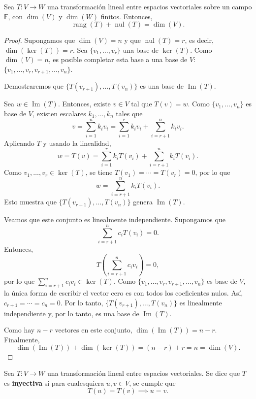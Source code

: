 \begin{theorem}\label{teodim}
Sea $T: V \to W$ una transformación lineal entre espacios vectoriales sobre un campo $\mathbb{F}$, con $\dim(V)$ y $\dim(W)$ finitos. Entonces,
\[
\operatorname{rang}(T) + \operatorname{nul}(T) = \dim(V).
\]
\begin{proof}
Supongamos que $\dim(V) = n$ y que $\operatorname{nul}(T) = r$, es decir, $\dim(\ker(T)) = r$. Sea $\{v_1, \ldots, v_r\}$ una base de $\ker(T)$. Como $\dim(V) = n$, es posible completar esta base a una base de $V$: $\{v_1, \ldots, v_r, v_{r+1}, \ldots, v_n\}$.

Demostraremos que $\{T(v_{r+1}), \ldots, T(v_n)\}$ es una base de $\operatorname{Im}(T)$.

Sea $w \in \operatorname{Im}(T)$. Entonces, existe $v \in V$ tal que $T(v) = w$. Como $\{v_1, \ldots, v_n\}$ es base de $V$, existen escalares $k_1, \ldots, k_n$ tales que
\[
v = \sum_{i=1}^n k_i v_i = \sum_{i=1}^r k_i v_i + \sum_{i=r+1}^n k_i v_i.
\]
Aplicando $T$ y usando la linealidad,
\[
w = T(v) = \sum_{i=1}^r k_i T(v_i) + \sum_{i=r+1}^n k_i T(v_i).
\]
Como $v_1, \ldots, v_r \in \ker(T)$, se tiene $T(v_1) = \cdots = T(v_r) = 0$, por lo que
\[
w = \sum_{i=r+1}^n k_i T(v_i).
\]
Esto muestra que $\{T(v_{r+1}), \ldots, T(v_n)\}$ genera $\operatorname{Im}(T)$.

Veamos que este conjunto es linealmente independiente. Supongamos que
\[
\sum_{i=r+1}^n c_i T(v_i) = 0.
\]
Entonces,
\[
T\left(\sum_{i=r+1}^n c_i v_i\right) = 0,
\]
por lo que $\sum_{i=r+1}^n c_i v_i \in \ker(T)$. Como $\{v_1, \ldots, v_r, v_{r+1}, \ldots, v_n\}$ es base de $V$, la única forma de escribir el vector cero es con todos los coeficientes nulos. Así, $c_{r+1} = \cdots = c_n = 0$. Por lo tanto, $\{T(v_{r+1}), \ldots, T(v_n)\}$ es linealmente independiente y, por lo tanto, es una base de $\operatorname{Im}(T)$.

Como hay $n-r$ vectores en este conjunto, $\dim(\operatorname{Im}(T)) = n - r$. Finalmente,
\[
\dim(\operatorname{Im}(T)) + \dim(\ker(T)) = (n - r) + r = n = \dim(V).
\]
\end{proof}
\end{theorem}


\begin{definition}
Sea $T: V \to W$ una transformación lineal entre espacios vectoriales. Se dice que $T$ es \textbf{inyectiva} si para cualesquiera $u, v \in V$, se cumple que
\[
T(u) = T(v) \implies u = v.
\]
\end{definition}

